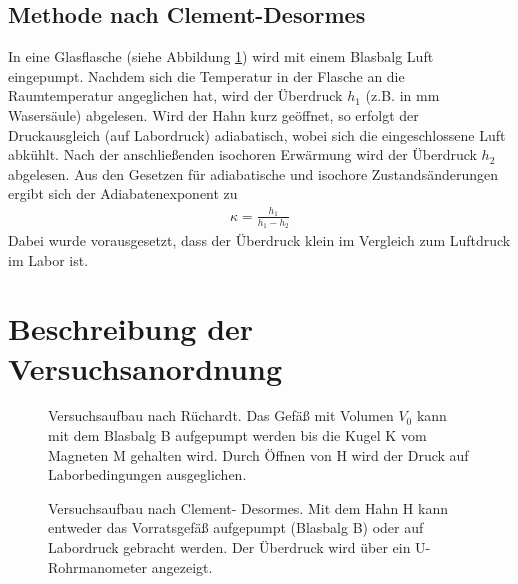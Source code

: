 \documentclass{article}
\begin{document}
\subsection{Methode nach Clement-Desormes}

In eine Glasflasche (siehe Abbildung \ref{fig:pic2}) wird mit einem Blasbalg Luft eingepumpt. Nachdem sich die Temperatur in der Flasche an die Raumtemperatur angeglichen hat, wird der Überdruck $h_1$ (z.B. in mm Wasersäule) abgelesen. Wird der Hahn kurz geöffnet, so erfolgt der Druckausgleich (auf Labordruck) adiabatisch, wobei sich die eingeschlossene Luft abkühlt. Nach der anschließenden isochoren Erwärmung wird der Überdruck $h_2$ abgelesen. Aus den Gesetzen für adiabatische und isochore Zustandsänderungen ergibt sich der Adiabatenexponent zu
\begin{align}
\kappa = \frac{h_1}{h_1-h_2}
\end{align}
Dabei wurde vorausgesetzt, dass der Überdruck klein im Vergleich zum Luftdruck im Labor ist.




\section{Beschreibung der Versuchsanordnung}

\begin{figure}[h]

\begin{floatrow}
{\caption{Versuchsaufbau nach Rüchardt.
Das Gefäß mit Volumen $V_0$ kann mit dem
Blasbalg B aufgepumpt werden bis die Kugel K vom Magneten M gehalten wird. Durch
Öffnen von H wird der Druck auf Laborbedingungen ausgeglichen.
}
\label{fig:pic1}}

{\caption{Versuchsaufbau nach Clement-
Desormes. Mit dem Hahn H kann entweder
das Vorratsgefäß aufgepumpt (Blasbalg B) oder auf Labordruck gebracht werden. Der Überdruck wird über ein U-Rohrmanometer angezeigt.
}
\label{fig:pic2}}
\end{floatrow}

\end{figure}
\end{document}
